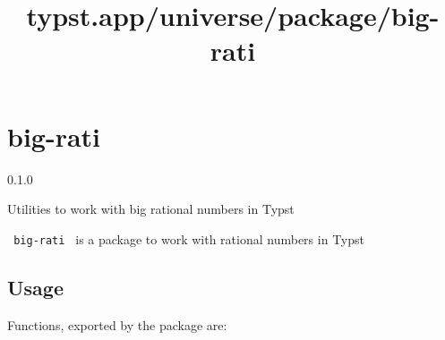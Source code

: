 \title{typst.app/universe/package/big-rati}

\label{banner}
\section{big-rati}\label{big-rati}

{ 0.1.0 }

Utilities to work with big rational numbers in Typst

\label{readme}
\texttt{\ big-rati\ } is a package to work with rational numbers in
Typst

\subsection{Usage}\label{usage}

\begin{Shaded}
\begin{Highlighting}[]




\end{Highlighting}
\end{Shaded}

Functions, exported by the package are:

